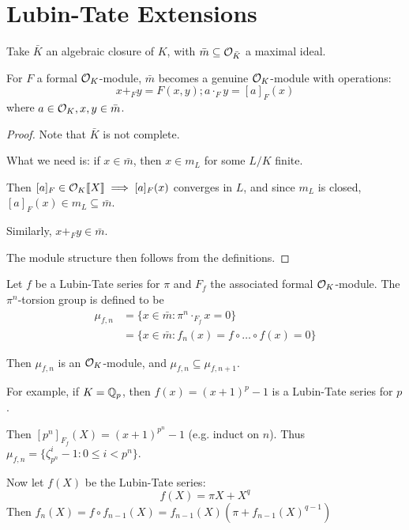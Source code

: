 \documentclass[10pt,a4paper]{article}
\begin{document}
\section{Lubin-Tate Extensions}
Take $\bar{K}$ an algebraic closure of $K$, with $\bar{m} \subseteq \mathcal{O}_{\bar{K}}$ a maximal ideal.
\begin{lemma}
  For $F$ a formal $\mathcal{O}_K$-module, $\bar{m}$ becomes a genuine $\mathcal{O}_K$-module with operations:
  \[x+_F y = F(x,y); a\cdot_F y = [a]_{F}(x)\]
  where $a \in \mathcal{O}_K, x,y \in \bar{m}$.
\end{lemma}
\begin{proof}
  Note that $\bar{K}$ is not complete.

  What we need is: if $x \in \bar{m}$, then $x \in m_L$ for some $L/K$ finite.

  Then $[a]_F \in \mathcal{O}_K\llbracket X \rrbracket \implies [a]_F(x)$ converges in $L$, and since $m_L$ is closed, $[a]_F(x) \in m_L \subseteq \bar{m}$.

  Similarly, $x+_F y \in \bar{m}$.

  The module structure then follows from the definitions.
\end{proof}
\begin{definition}
  Let $f$ be a Lubin-Tate series for $\pi$ and $F_f$ the associated formal $\mathcal{O}_K$-module. The $\pi^n$-torsion group is defined to be
  \begin{align*}
    \mu_{f,n} &= \{x \in \bar{m} : \pi^n \cdot_{F_f} x=0\}\\
    &= \{x \in \bar{m} : f_n(x) = f \circ \ldots \circ f (x) = 0\}
  \end{align*}
\end{definition}
Then $\mu_{f,n}$ is an $\mathcal{O}_K$-module, and $\mu_{f,n} \subseteq \mu_{f, n+1}$.

For example, if $K = \mathbb{Q}_p$, then $f(x) = (x+1)^p-1$ is a Lubin-Tate series for $p$.

Then $[p^n]_{F_f}(X) = (x+1)^{p^n}-1$ (e.g. induct on $n$). Thus $\mu_{f, n} = \{\zeta_{p^n}^i-1 : 0 \leq i < p^n\}$.

Now let $f(X)$ be the Lubin-Tate series:
\[f(X) = \pi X + X^q\]
Then $f_n(X) = f \circ f_{n-1}(X) = f_{n-1}(X)(\pi+f_{n-1}(X)^{q-1})$
\end{document}
